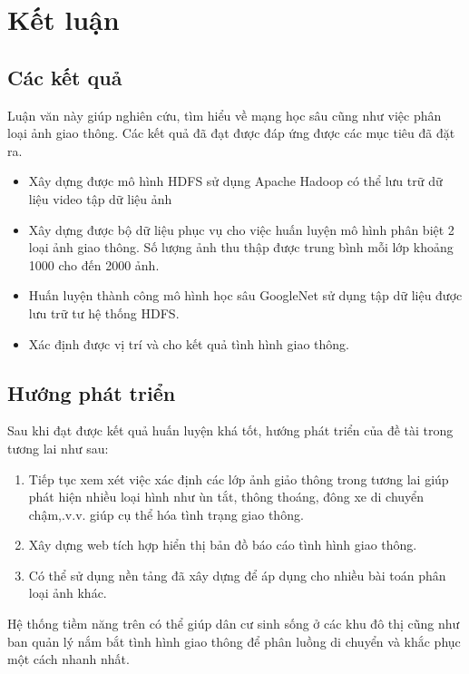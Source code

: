 \chapter{Kết luận}

\section{Các kết quả }
Luận văn này giúp nghiên cứu, tìm hiểu về mạng học sâu cũng như việc phân loại ảnh giao thông. Các kết quả đã đạt được đáp ứng được các mục tiêu đã đặt ra.
	\begin{itemize}
		\item Xây dựng được mô hình HDFS sử dụng Apache Hadoop có thể lưu trữ dữ liệu video tập dữ liệu ảnh
		\item Xây dựng được bộ dữ liệu phục vụ cho việc huấn luyện mô hình phân biệt 2 loại ảnh giao thông. Số lượng ảnh thu thập được trung bình mỗi lớp khoảng 1000 cho đến 2000 ảnh.
		\item Huấn luyện thành công mô hình học sâu GoogleNet sử dụng tập dữ liệu được lưu trữ tư hệ thống HDFS.
		\item Xác định được vị trí và cho kết quả tình hình giao thông.	
	\end{itemize}
\section{Hướng phát triển}
Sau khi đạt được kết quả huấn luyện khá tốt, hướng phát triển của đề tài trong tương lai như sau:
\begin{enumerate}
	\item Tiếp tục xem xét việc xác định các lớp ảnh giảo thông trong tương lai giúp phát hiện nhiều loại hình như ùn tắt, thông thoáng, đông xe di chuyển chậm,.v.v. giúp cụ thể hóa tình trạng giao thông.
	\item Xây dựng web tích hợp hiển thị bản đồ báo cáo tình hình giao thông.
	\item Có thể sử dụng nền tảng đã xây dựng để áp dụng cho nhiều bài toán phân loại ảnh khác.
\end{enumerate}
	

Hệ thống tiềm năng trên có thể giúp dân cư sinh sống ở các khu đô thị cũng như ban quản lý nắm bắt tình hình giao thông để phân luồng di chuyển và khắc phục một cách nhanh nhất.